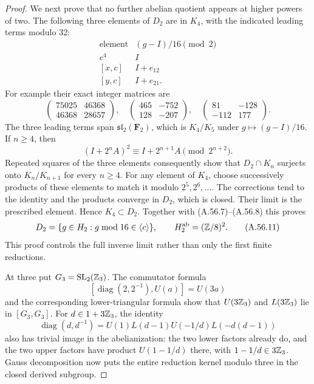 \begin{proof}
We next prove that no further abelian quotient appears at
higher powers of two.  The following three elements of $D_2$
are in $K_4$, with the indicated leading terms modulo 32:
\[
 \begin{array}{c|c}
 \text{element}&(g-I)/16\pmod2\\ \hline
 c^4&I\\
 {[x,c]}&I+e_{12}\\
 {[y,c]}&I+e_{21}.
 \end{array}
\tag{A.56.9}
\]
For example their exact integer matrices are
\[
 \begin{pmatrix}75025&46368\\46368&28657\end{pmatrix},\quad
 \begin{pmatrix}465&-752\\128&-207\end{pmatrix},\quad
 \begin{pmatrix}81&-128\\-112&177\end{pmatrix}.
\]
The three leading terms span
$\mathfrak{sl}_2(\mathbf F_2)$, which is
$K_4/K_5$ under $g\mapsto(g-I)/16$.  If $n\ge4$, then
\[
 (I+2^nA)^2\equiv I+2^{n+1}A\pmod{2^{n+2}}.
\tag{A.56.10}
\]
Repeated squares of the three elements consequently show that
$D_2\cap K_n$ surjects onto $K_n/K_{n+1}$ for every $n\ge4$.
For any element of $K_4$, choose successively products of
these elements to match it modulo $2^5,2^6,\ldots$.
The corrections tend to the identity and the products converge
in $D_2$, which is closed.  Their limit is the prescribed
element.  Hence $K_4\subset D_2$.
Together with (A.56.7)--(A.56.8) this proves
\[
 D_2=\{g\in H_2:g\bmod16\in\langle c\rangle\},
                         \qquad H_2^{\rm ab}=(\mathbb Z/8)^2.
\tag{A.56.11}
\]
This proof controls the full inverse limit rather than only
the first finite reductions.

At three put $G_3=\operatorname{SL}_2(\mathbb Z_3)$.
The commutator formula
\[
 [\operatorname{diag}(2,2^{-1}),U(a)]=U(3a)
\tag{A.56.12}
\]
and the corresponding lower-triangular formula show that
$U(3\mathbb Z_3)$ and $L(3\mathbb Z_3)$ lie in $[G_3,G_3]$.
For $d\in1+3\mathbb Z_3$, the identity
\[
 \operatorname{diag}(d,d^{-1})=
 U(1)L(d-1)U(-1/d)L(-d(d-1))
\tag{A.56.13}
\]
also has trivial image in the abelianization: the two lower
factors already do, and the two upper factors have product
$U(1-1/d)$ there, with $1-1/d\in3\mathbb Z_3$.
Gauss decomposition now puts the entire reduction kernel
modulo three in the closed derived subgroup.


\end{proof}
